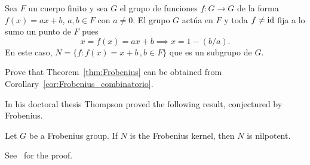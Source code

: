 \begin{example}
  Sea $F$ un cuerpo finito y sea $G$ el grupo de funciones $f\colon G\to G$ de
  la forma $f(x)=ax+b$, $a,b\in F$ con $a\ne0$. El grupo $G$ actúa en $F$ y toda
  $f\ne\operatorname{id}$ fija a lo sumo un punto de $F$ pues 
  \[
	x=f(x)=ax+b\implies x=1-(b/a).
  \]
  En este caso, $N=\{f:f(x)=x+b\,,b\in F\}$ que es
  un subgrupo de $G$.
\end{example}

\begin{exercise}
    Prove that Theorem~\ref{thm:Frobenius} can be obtained from
    Corollary~\ref{cor:Frobenius_combinatorio}.
\end{exercise}



In his doctoral thesis Thompson proved the following result, conjectured
by Frobenius. 

\begin{theorem}[Thompson]
    Let $G$ be a Frobenius group. If $N$ is the Frobenius kernel, then $N$ 
    is nilpotent.
\end{theorem}

See~\cite[Theorem 6.24]{MR2426855} for the proof.


